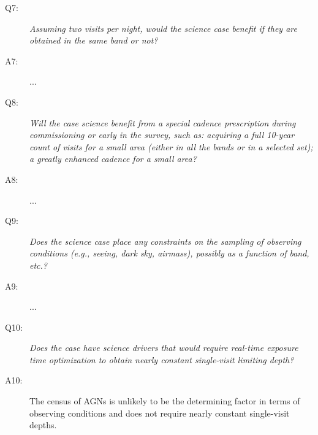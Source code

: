 \begin{description}
\item[Q7:] {\it Assuming two visits per night, would the science case
benefit if they are obtained in the same band or not?}

\item[A7:] ...

\item[Q8:] {\it Will the case science benefit from a special cadence
prescription during commissioning or early in the survey, such as:
acquiring a full 10-year count of visits for a small area (either in all
the bands or in a  selected set); a greatly enhanced cadence for a small
area?}

\item[A8:] ...

\item[Q9:] {\it Does the science case place any constraints on the
sampling of observing conditions (e.g., seeing, dark sky, airmass),
possibly as a function of band, etc.?}

\item[A9:] ...

\item[Q10:] {\it Does the case have science drivers that would require
real-time exposure time optimization to obtain nearly constant
single-visit limiting depth?}

\item[A10:] The census of AGNs is unlikely to be the determining factor
in terms of observing conditions and does not require nearly constant
single-visit depths.

\end{description}


\navigationbar
